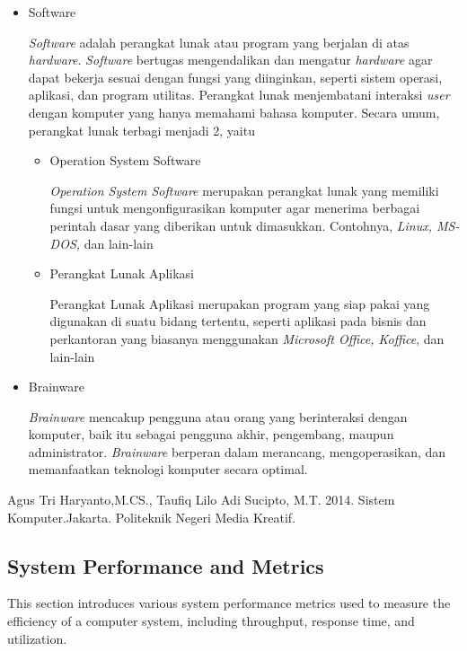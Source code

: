 \documentclass[12pt]{article}
\begin{document}
\begin{itemize}
        \item Software 
        \par
        \textit{Software} adalah perangkat lunak atau program yang berjalan di atas \textit{hardware}. \textit{Software} bertugas mengendalikan dan mengatur \textit{hardware} agar dapat bekerja sesuai dengan fungsi yang diinginkan, seperti sistem operasi, aplikasi, dan program utilitas. Perangkat lunak menjembatani interaksi\textit{ user} dengan komputer yang hanya memahami bahasa komputer. Secara umum, perangkat lunak terbagi menjadi 2, yaitu
        \begin{itemize}
            \item Operation System Software
            \par
            \textit{Operation System Software} merupakan perangkat lunak yang memiliki fungsi untuk mengonfigurasikan komputer agar menerima berbagai perintah dasar yang diberikan untuk dimasukkan. Contohnya, \textit{Linux, MS-DOS,} dan lain-lain
            \item Perangkat Lunak Aplikasi
            \par
            Perangkat Lunak Aplikasi merupakan program yang siap pakai yang digunakan di suatu bidang tertentu, seperti aplikasi pada bisnis dan perkantoran yang biasanya menggunakan\textit{ Microsoft Office, Koffice}, dan lain-lain
        \end{itemize}
        \item Brainware 
        \par
       \textit{ Brainware } mencakup pengguna atau orang yang berinteraksi dengan komputer, baik itu sebagai pengguna akhir, pengembang, maupun administrator. \textit{Brainware }berperan dalam merancang, mengoperasikan, dan memanfaatkan teknologi komputer secara optimal.
    \end{itemize}
    \begin{bibliography}
    Agus Tri Haryanto,M.CS., Taufiq Lilo Adi Sucipto, M.T. 2014. Sistem Komputer.Jakarta. Politeknik Negeri Media Kreatif.
\end{bibliography}

   

\subsection{System Performance and Metrics}
This section introduces various system performance metrics used to measure the efficiency of a computer system, including throughput, response time, and utilization.
\end{document}
